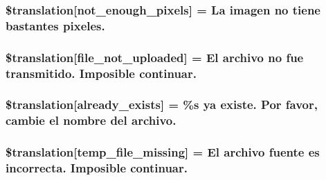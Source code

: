 \subsubsection[{\$translation}]{\setlength{\rightskip}{0pt plus 5cm}\$translation\mbox{[}\textquotesingle{}not\+\_\+enough\+\_\+pixels\textquotesingle{}\mbox{]} = \textquotesingle{}La imagen no tiene bastantes pixeles.\textquotesingle{}}\label{class_8upload_8es___e_s_8php_a1fe342c27ce61f4ff4e0120ba647033e}
\hypertarget{class_8upload_8es___e_s_8php_a4ce76e7be0b3a03c2b47f6d70c21832e}{}
\subsubsection[{\$translation}]{\setlength{\rightskip}{0pt plus 5cm}\$translation\mbox{[}\textquotesingle{}file\+\_\+not\+\_\+uploaded\textquotesingle{}\mbox{]} = \textquotesingle{}El archivo no fue transmitido. Imposible continuar.\textquotesingle{}}\label{class_8upload_8es___e_s_8php_a4ce76e7be0b3a03c2b47f6d70c21832e}
\hypertarget{class_8upload_8es___e_s_8php_afd84e910217f04139f567c41e292afa5}{}
\subsubsection[{\$translation}]{\setlength{\rightskip}{0pt plus 5cm}\$translation\mbox{[}\textquotesingle{}already\+\_\+exists\textquotesingle{}\mbox{]} = \textquotesingle{}\%s ya existe. Por favor, cambie el nombre del archivo.\textquotesingle{}}\label{class_8upload_8es___e_s_8php_afd84e910217f04139f567c41e292afa5}
\hypertarget{class_8upload_8es___e_s_8php_ab0fa87a88aba2624004581eed0633325}{}
\subsubsection[{\$translation}]{\setlength{\rightskip}{0pt plus 5cm}\$translation\mbox{[}\textquotesingle{}temp\+\_\+file\+\_\+missing\textquotesingle{}\mbox{]} = \textquotesingle{}El archivo fuente es incorrecta. Imposible continuar.\textquotesingle{}}\label{class_8upload_8es___e_s_8php_ab0fa87a88aba2624004581eed0633325}
\hypertarget{class_8upload_8es___e_s_8php_aceaaf7355acaaf10f0ae60378d03c468}{}

